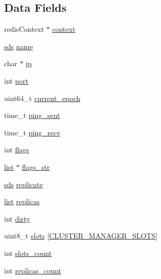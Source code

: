 \subsection*{Data Fields}
\begin{DoxyCompactItemize}
\item 
redis\+Context $\ast$ \hyperlink{structcluster_manager_node_ace869d36dc1b4de4b6d046c0c71486cb}{context}
\item 
\hyperlink{sds_8h_ad69abac3df4532879db9642c95f5ef6f}{sds} \hyperlink{structcluster_manager_node_a78d661a433637c5e0fac8a377e3ddeb6}{name}
\item 
char $\ast$ \hyperlink{structcluster_manager_node_afbc356cd0e25d1dbbece7c10fd025fa6}{ip}
\item 
int \hyperlink{structcluster_manager_node_a63c89c04d1feae07ca35558055155ffb}{port}
\item 
uint64\+\_\+t \hyperlink{structcluster_manager_node_ab523bc9f0cc579208ad514cc588d3981}{current\+\_\+epoch}
\item 
time\+\_\+t \hyperlink{structcluster_manager_node_a3131021cfa8e1212d327a9ea5593e585}{ping\+\_\+sent}
\item 
time\+\_\+t \hyperlink{structcluster_manager_node_ad8bbaa889c9a9c08137836207b72b64a}{ping\+\_\+recv}
\item 
int \hyperlink{structcluster_manager_node_ac8bf36fe0577cba66bccda3a6f7e80a4}{flags}
\item 
\hyperlink{structlist}{list} $\ast$ \hyperlink{structcluster_manager_node_a2996ddb21acb702fdb383abf6ea1c0b3}{flags\+\_\+str}
\item 
\hyperlink{sds_8h_ad69abac3df4532879db9642c95f5ef6f}{sds} \hyperlink{structcluster_manager_node_af6f45314e664ae7be8f68488be45354d}{replicate}
\item 
\hyperlink{structlist}{list} \hyperlink{structcluster_manager_node_ad83e6ba102626a40bb3fab569c04a735}{replicas}
\item 
int \hyperlink{structcluster_manager_node_a120b75c12097e7fdda71535d04ae7880}{dirty}
\item 
uint8\+\_\+t \hyperlink{structcluster_manager_node_a6f06905b827dc0f8fb569761fb55cab6}{slots} \mbox{[}\hyperlink{redis-cli_8c_adff5eca00afc90a8c3c213bb7100cdc0}{C\+L\+U\+S\+T\+E\+R\+\_\+\+M\+A\+N\+A\+G\+E\+R\+\_\+\+S\+L\+O\+TS}\mbox{]}
\item 
int \hyperlink{structcluster_manager_node_ac71d8fbda6f0a3ab58593d31114de67a}{slots\+\_\+count}
\item 
int \hyperlink{structcluster_manager_node_a6a823cf956d3d5ba7505d98158f95c45}{replicas\+\_\+count}

\end{DoxyCompactItemize}
